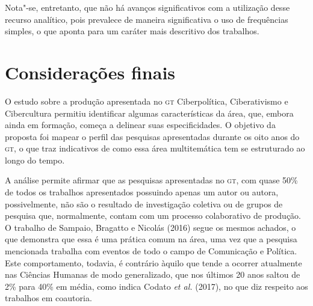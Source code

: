 Nota"-se, entretanto, que não há avanços significativos com a utilização
desse recurso analítico, pois prevalece de maneira significativa o uso
de frequências simples, o que aponta para um caráter mais descritivo dos
trabalhos.

\section{Considerações finais}

O estudo sobre a produção apresentada no \textsc{gt} Ciberpolítica, Ciberativismo
e Cibercultura permitiu identificar algumas características da área,
que, embora ainda em formação, começa a delinear suas especificidades. O
objetivo da proposta foi mapear o perfil das pesquisas apresentadas
durante os oito anos do \textsc{gt}, o que traz indicativos de como essa área
multitemática tem se estruturado ao longo do tempo.

A análise permite afirmar que as pesquisas apresentadas no \textsc{gt}, com quase
50\% de todos os trabalhos apresentados possuindo apenas um autor ou
autora, possivelmente, não são o resultado de investigação coletiva ou
de grupos de pesquisa que, normalmente, contam com um processo
colaborativo de produção. O trabalho de Sampaio, Bragatto e Nicolás
(2016) segue os mesmos achados, o que demonstra que essa é uma prática
comum na área, uma vez que a pesquisa mencionada trabalha com eventos de
todo o campo de Comunicação e Política. Este comportamento, todavia, é
contrário àquilo que tende a ocorrer atualmente nas Ciências Humanas de
modo generalizado, que nos últimos 20 anos saltou de 2\% para 40\% em
média, como indica Codato \textit{et al.} (2017), no que diz respeito aos
trabalhos em coautoria.

